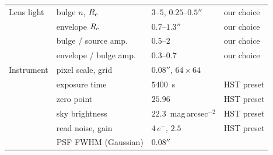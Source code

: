 \begin{tabular}{@{}llll@{}}
\addlinespace[2pt]
Lens light & bulge $n$, $R_{\rm e}$ & $3$--$5$, $0.25$--$0.5''$ & our choice \\
 & envelope $R_{\rm e}$ & $0.7$--$1.3''$ & our choice \\
 & bulge / source amp. & $0.5$--$2$ & our choice \\
 & envelope / bulge amp. & $0.3$--$0.7$ & our choice \\
\addlinespace[2pt]
Instrument & pixel scale, grid & $0.08''$, $64\times64$ & \citet{tsang2024} \\
 & exposure time & $5400$~s & HST preset \\
 & zero point & $25.96$ & HST preset \\
 & sky brightness & $22.3$~mag\,arcsec$^{-2}$ & HST preset \\
 & read noise, gain & $4\,e^-$, $2.5$ & HST preset \\
 & PSF FWHM (Gaussian) & $0.08''$ & \citet{tsang2024} \\
\bottomrule
\end{tabular}
